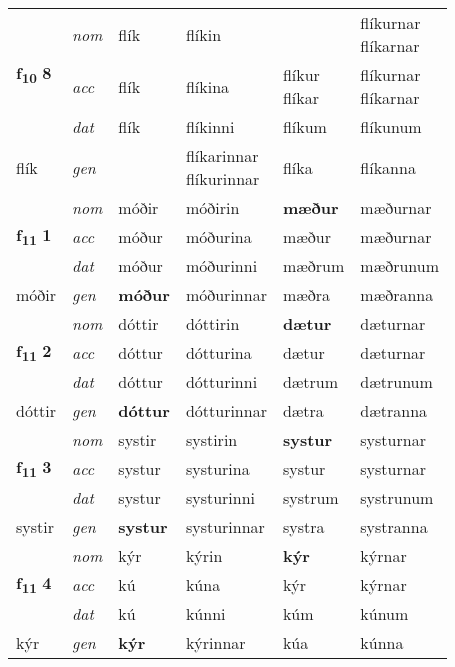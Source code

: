 \begin{longtable}[l]{X>{\footnotesize\itshape}XXXXX}
\multirow{3}{*}{{{\textbf{f{\textsubscript{10}}} \Large{\textbf{8}}}}} & nom & flík & flíkin & \textbf{\specialcell{flíkur\\ flíkar}} & \specialcell{flíkurnar\\ flíkarnar} \\*
 & acc & flík & flíkina & \specialcell{flíkur\\ flíkar} & \specialcell{flíkurnar\\ flíkarnar} \\*
 & dat & flík & flíkinni & flíkum & flíkunum \\*
 {\footnotesize{flík}} & gen & \textbf{\specialcell{flíkar\\ flíkur}} & \specialcell{flíkarinnar\\ flíkurinnar} & flíka & flíkanna \\
\midrule

\multirow{3}{*}{{{\textbf{f{\textsubscript{11}}} \Large{\textbf{1}}}}} & nom & móðir & móðirin & \textbf{mæður} & mæðurnar \\*
 & acc & móður & móðurina & mæður & mæðurnar \\*
 & dat & móður & móðurinni & mæðrum & mæðrunum \\*
 {\footnotesize{móðir}} & gen & \textbf{móður} & móðurinnar & mæðra & mæðranna \\
\midrule

\multirow{3}{*}{{{\textbf{f{\textsubscript{11}}} \Large{\textbf{2}}}}} & nom & dóttir & dóttirin & \textbf{dætur} & dæturnar \\*
 & acc & dóttur & dótturina & dætur & dæturnar \\*
 & dat & dóttur & dótturinni & dætrum & dætrunum \\*
 {\footnotesize{dóttir}} & gen & \textbf{dóttur} & dótturinnar & dætra & dætranna \\
\midrule

\multirow{3}{*}{{{\textbf{f{\textsubscript{11}}} \Large{\textbf{3}}}}} & nom & systir & systirin & \textbf{systur} & systurnar \\*
 & acc & systur & systurina & systur & systurnar \\*
 & dat & systur & systurinni & systrum & systrunum \\*
 {\footnotesize{systir}} & gen & \textbf{systur} & systurinnar & systra & systranna \\
\midrule

\multirow{3}{*}{{{\textbf{f{\textsubscript{11}}} \Large{\textbf{4}}}}} & nom & kýr & kýrin & \textbf{kýr} & kýrnar \\*
 & acc & kú & kúna & kýr & kýrnar \\*
 & dat & kú & kúnni & kúm & kúnum \\*
 {\footnotesize{kýr}} & gen & \textbf{kýr} & kýrinnar & kúa & kúnna \\
\midrule


\end{longtable}
